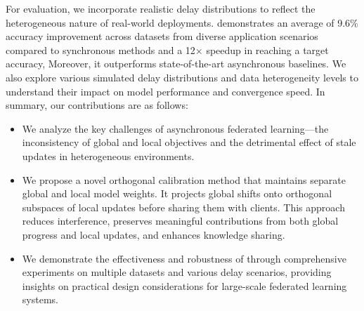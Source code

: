For evaluation, we incorporate realistic delay distributions to reflect the heterogeneous nature of real-world deployments. \our demonstrates an average of 9.6\% accuracy improvement across datasets from diverse application scenarios compared to synchronous methods and a 12$\times$ speedup in reaching a target accuracy, Moreover, it outperforms state-of-the-art asynchronous baselines. We also explore various simulated delay distributions and data heterogeneity levels to understand their impact on model performance and convergence speed.
In summary, our contributions are as follows:
\begin{itemize}[leftmargin=*]
    \item We analyze the key challenges of asynchronous federated learning---the inconsistency of global and local objectives and the detrimental effect of stale updates in heterogeneous environments.
    \item We propose a novel orthogonal calibration method that maintains separate global and local model weights. It projects global shifts onto orthogonal subspaces of local updates before sharing them with clients. This approach reduces interference, preserves meaningful contributions from both global progress and local updates, and enhances knowledge sharing. 
    \item We demonstrate the effectiveness and robustness of \our through comprehensive experiments on multiple datasets and various delay scenarios, providing insights on practical design considerations for large-scale federated learning systems.
\end{itemize}

